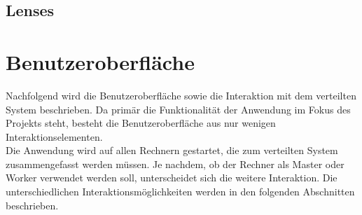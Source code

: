\subsection{Lenses}


\section{Benutzeroberfläche}
Nachfolgend wird die Benutzeroberfläche sowie die Interaktion mit dem verteilten System beschrieben. Da primär die Funktionalität der Anwendung im Fokus des Projekts steht, besteht die Benutzeroberfläche aus nur wenigen Interaktionselementen. \\
Die Anwendung wird auf allen Rechnern gestartet, die zum verteilten System zusammengefasst werden müssen. Je nachdem, ob der Rechner als Master oder Worker verwendet werden soll, unterscheidet sich die weitere Interaktion. Die unterschiedlichen Interaktionsmöglichkeiten werden in den folgenden Abschnitten beschrieben. 

